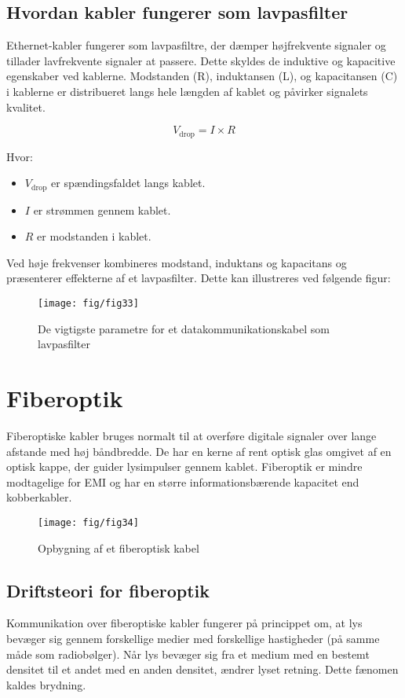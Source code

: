 \subsection{Hvordan kabler fungerer som lavpasfilter}
Ethernet-kabler fungerer som lavpasfiltre, der dæmper højfrekvente signaler og tillader lavfrekvente signaler at passere. Dette skyldes de induktive og kapacitive egenskaber ved kablerne. Modstanden (R), induktansen (L), og kapacitansen (C) i kablerne er distribueret langs hele længden af kablet og påvirker signalets kvalitet.

\[
V_{\text{drop}} = I \times R
\]

Hvor:
\begin{itemize}
	\item \( V_{\text{drop}} \) er spændingsfaldet langs kablet.
	\item \( I \) er strømmen gennem kablet.
	\item \( R \) er modstanden i kablet.
\end{itemize}

Ved høje frekvenser kombineres modstand, induktans og kapacitans og præsenterer effekterne af et lavpasfilter. Dette kan illustreres ved følgende figur:

\begin{figure}[h!]
	\centering
	\texttt{[image: fig/fig33]}
	\caption{De vigtigste parametre for et datakommunikationskabel som lavpasfilter}
	\label{fig:low_pass_filter}
\end{figure}

\section{Fiberoptik}
Fiberoptiske kabler bruges normalt til at overføre digitale signaler over lange afstande med høj båndbredde. De har en kerne af rent optisk glas omgivet af en optisk kappe, der guider lysimpulser gennem kablet. Fiberoptik er mindre modtagelige for EMI og har en større informationsbærende kapacitet end kobberkabler.

\begin{figure}[h!]
	\centering
	\texttt{[image: fig/fig34]}
	\caption{Opbygning af et fiberoptisk kabel}
	\label{fig:fiber_optic}
\end{figure}

\subsection{Driftsteori for fiberoptik}
Kommunikation over fiberoptiske kabler fungerer på princippet om, at lys bevæger sig gennem forskellige medier med forskellige hastigheder (på samme måde som radiobølger). Når lys bevæger sig fra et medium med en bestemt densitet til et andet med en anden densitet, ændrer lyset retning. Dette fænomen kaldes brydning.

